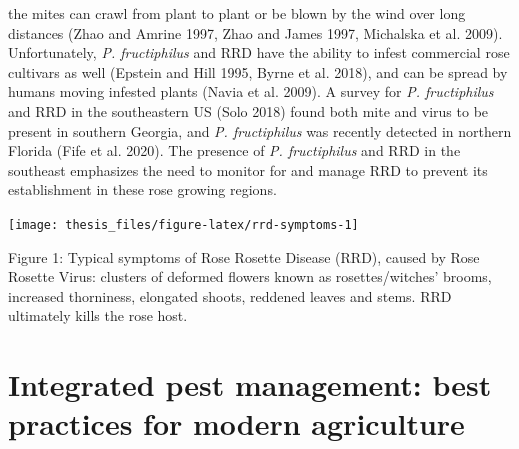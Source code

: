 \documentclass[12pt,final,CPage]{ufthesis}
\begin{document}
{the mites can crawl from plant to plant or be blown by the wind over long distances (Zhao and Amrine 1997, Zhao and James 1997, Michalska et al. 2009). Unfortunately, \emph{P. fructiphilus} and RRD have the ability to infest commercial rose cultivars as well (Epstein and Hill 1995, Byrne et al. 2018), and can be spread by humans moving infested plants (Navia et al. 2009). A survey for \emph{P. fructiphilus} and RRD in the southeastern US (Solo 2018) found both mite and virus to be present in southern Georgia, and \emph{P. fructiphilus} was recently detected in northern Florida (Fife et al. 2020). The presence of \emph{P. fructiphilus} and RRD in the southeast emphasizes the need to monitor for and manage RRD to prevent its establishment in these rose growing regions.
  \begin{center}\texttt{[image: thesis\_files/figure-latex/rrd-symptoms-1]} \end{center}

  Figure 1: Typical symptoms of Rose Rosette Disease (RRD), caused by Rose Rosette Virus: clusters of deformed flowers known as rosettes/witches' brooms, increased thorniness, elongated shoots, reddened leaves and stems. RRD ultimately kills the rose host.

  \hypertarget{litrev-ipm}{%
  \section{Integrated pest management: best practices for modern agriculture}\label{litrev-ipm}}

}
\end{document}
